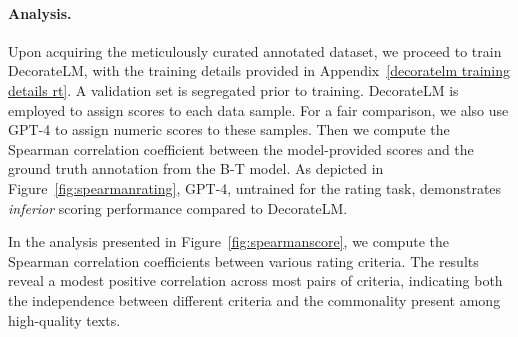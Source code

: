 \documentclass[11pt]{article}
\begin{document}

\paragraph{Analysis.}
Upon acquiring the meticulously curated annotated dataset, we proceed to train DecorateLM, with the training details provided in Appendix~\ref{decoratelm training details rt}. A validation set is segregated prior to training. DecorateLM is employed to assign scores to each data sample. For a fair comparison, we also use GPT-4 to assign numeric scores to these samples. Then we compute the Spearman correlation coefficient between the model-provided scores and the ground truth annotation from the B-T model.
As depicted in Figure~\ref{fig:spearmanrating}, GPT-4, untrained for the rating task, demonstrates \textit{inferior} scoring performance compared to DecorateLM.

In the analysis presented in Figure~\ref{fig:spearmanscore}, we compute the Spearman correlation coefficients between various rating criteria. The results reveal a modest positive correlation across most pairs of criteria, indicating both the independence between different criteria and the commonality present among high-quality texts. 
\end{document}
